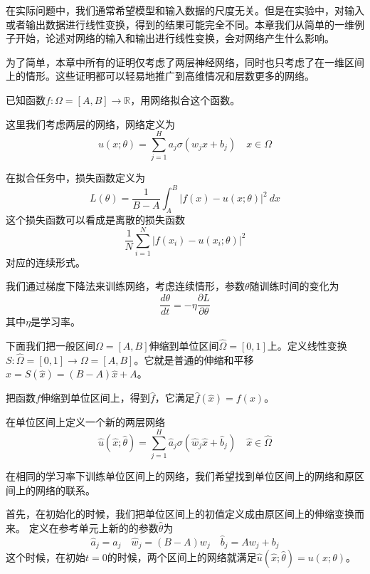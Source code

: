 

在实际问题中，我们通常希望模型和输入数据的尺度无关。但是在实验中，对输入或者输出数据进行线性变换，得到的结果可能完全不同。本章我们从简单的一维例子开始，论述对网络的输入和输出进行线性变换，会对网络产生什么影响。

为了简单，本章中所有的证明仅考虑了两层神经网络，同时也只考虑了在一维区间上的情形。这些证明都可以轻易地推广到高维情况和层数更多的网络。


已知函数$f: \Omega = [A, B] \rightarrow \mathbb{R}$，用网络拟合这个函数。

这里我们考虑两层的网络，网络定义为
\begin{equation}\label{neteq}
u(x; \theta) = \sum_{j=1}^{H} a_j \sigma(w_j x + b_j) \quad x \in \Omega
\end{equation}

在拟合任务中，损失函数定义为
\begin{equation}\label{loss}
L(\theta) = \frac{1}{B-A} \int_{A}^{B} |f(x) - u(x; \theta)|^2 \ dx
\end{equation}
这个损失函数可以看成是离散的损失函数
$$ \frac{1}{N} \sum_{i=1}^{N} |f(x_i) - u(x_i; \theta)|^2 $$
对应的连续形式。

我们通过梯度下降法来训练网络，考虑连续情形，参数$\theta$随训练时间的变化为
\begin{equation}\label{gd}
\frac{d \theta}{d t} = - \eta \frac{\partial L}{\partial \theta}
\end{equation}
其中$\eta$是学习率。

下面我们把一般区间$\Omega = [A, B]$伸缩到单位区间$\hat{\Omega} = [0,1]$上。定义线性变换$S: \hat{\Omega}= [0, 1] \rightarrow \Omega = [A, B]$。它就是普通的伸缩和平移$x = S(\hat{x}) = (B-A)\hat{x} + A$。

把函数$f$伸缩到单位区间上，得到$\hat{f}$，它满足$\hat{f}(\hat{x}) = f(x)$。

在单位区间上定义一个新的两层网络
\begin{equation}\label{nethat}
\hat{u}(\hat{x}; \hat{\theta}) = \sum_{j=1}^{H} \hat{a}_j \sigma(\hat{w}_j \hat{x} + \hat{b}_j) \quad \hat{x} \in \hat{\Omega}
\end{equation}

在相同的学习率下训练单位区间上的网络，我们希望找到单位区间上的网络和原区间上的网络的联系。

首先，在初始化的时候，我们把单位区间上的初值定义成由原区间上的伸缩变换而来。
定义在参考单元上新的的参数$\hat{\theta}$为
\begin{equation}\label{trans1}
\hat{a}_j = a_j \quad \hat{w}_j = (B-A) w_j \quad \hat{b}_j = A w_j + b_j
\end{equation}
这个时候，在初始$t=0$的时候，两个区间上的网络就满足$\hat{u}(\hat{x}; \hat{\theta}) = u(x; \theta)$。

